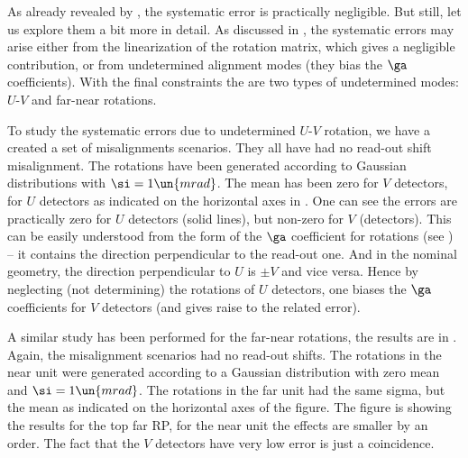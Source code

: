 
As already revealed by , the systematic error is practically negligible. But still, let us explore them a bit more in detail. As discussed in , the systematic errors may arise either from the linearization of the rotation matrix, which gives a negligible contribution, or from undetermined alignment modes (they bias the $\ga$ coefficients). With the final constraints the are two types of undetermined modes: $U$-$V$ and far-near rotations. 

To study the systematic errors due to undetermined $U$-$V$ rotation, we have a created a set of misalignments scenarios. They all have had no read-out shift misalignment. The rotations have been generated according to Gaussian distributions with $\si = 1\un{mrad}$. The mean has been zero for $V$ detectors, for $U$ detectors as indicated on the horizontal axes in . One can see the errors are practically zero for $U$ detectors (solid lines), but non-zero for $V$ (detectors). This can be easily understood from the form of the $\ga$ coefficient for rotations (see ) -- it contains the direction perpendicular to the read-out one. And in the nominal geometry, the direction perpendicular to $U$ is $\pm V$ and vice versa. Hence by neglecting (not determining) the rotations of $U$ detectors, one biases the $\ga$ coefficients for $V$ detectors (and gives raise to the related error).


A similar study has been performed for the far-near rotations, the results are in . Again, the misalignment scenarios had no read-out shifts. The rotations in the near unit were generated according to a Gaussian distribution with zero mean and $\si=1\un{mrad}$. The rotations in the far unit had the same sigma, but the mean as indicated on the horizontal axes of the figure. The figure is showing the results for the top far RP, for the near unit the effects are smaller by an order. The fact that the $V$ detectors have very low error is just a coincidence.

